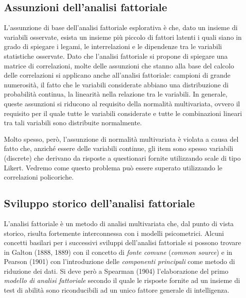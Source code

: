 \documentclass[
  11pt,
]{krantz}
\theoremstyle{definition}
\theoremstyle{definition}
\theoremstyle{definition}
\theoremstyle{definition}
\theoremstyle{remark}
\begin{document}
\hypertarget{assunzioni-dellanalisi-fattoriale}{%
\subsection{Assunzioni dell'analisi fattoriale}\label{assunzioni-dellanalisi-fattoriale}}

L'assunzione di base dell'analisi fattoriale esplorativa è che, dato un insieme di variabili osservate, esista un insieme più piccolo di fattori latenti i quali siano in grado di spiegare i legami, le interrelazioni e le dipendenze tra le variabili statistiche osservate. Dato che l'analisi fattoriale si propone di spiegare una matrice di correlazioni, molte delle assunzioni che stanno alla base del calcolo delle correlazioni si applicano anche all'analisi fattoriale: campioni di grande numerosità, il fatto che le variabili considerate abbiano una distribuzione di probabilità continua, la linearità nella relazione tra le variabili. In generale, queste assunzioni si riducono al requisito della normalità multivariata, ovvero il requisito per il quale tutte le variabili considerate e tutte le combinazioni lineari tra tali variabili sono distribuite normalmente.

Molto spesso, però, l'assunzione di normalità multivariata è violata a causa del fatto che, anziché essere delle variabili continue, gli item sono spesso variabili (discrete) che derivano da risposte a questionari fornite utilizzando scale di tipo Likert. Vedremo come questo problema può essere superato utilizzando le correlazioni policoriche.

\hypertarget{sviluppo-storico-dellanalisi-fattoriale}{%
\subsection{Sviluppo storico dell'analisi fattoriale}\label{sviluppo-storico-dellanalisi-fattoriale}}

L'analisi fattoriale è un metodo di analisi multivariata che, dal punto di vista storico, risulta fortemente interconnessa con i modelli psicometrici. Alcuni concetti basilari per i successivi sviluppi dell'analisi fattoriale si possono trovare in Galton (1888, 1889) con il concetto di \emph{fonte comune} (\emph{common source}) e in Pearson (1901) con l'introduzione delle \emph{componenti principali} come metodo di riduzione dei dati. Si deve però a Spearman (1904) l'elaborazione del primo \emph{modello di analisi fattoriale} secondo il quale le risposte fornite ad un insieme di test di abilità sono riconducibili ad un unico fattore generale di intelligenza.
\end{document}
